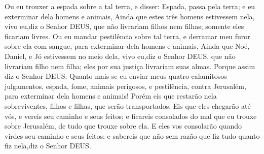 {  Ou
{} eu trouxer a espada sobre a tal terra, e disser: Espada, passa pela terra; e eu exterminar dela homens e animais,
  Ainda que estes três homens estivessem nela, vivo eu,diz o Senhor DEUS, que não livrariam filhos nem filhas; somente eles ficariam livres.
  Ou
{} eu mandar pestilência sobre tal terra, e derramar meu furor sobre ela com sangue, para exterminar dela homens e animais,
  Ainda que Noé, Daniel, e Jó estivessem no meio dela, vivo eu,diz o Senhor DEUS, que não livrariam filho nem filha; eles por sua justiça livrariam suas
{} almas.
  Porque assim diz o Senhor DEUS: Quanto mais se eu enviar meus quatro calamitosos
 julgamentos, espada, fome, animais perigosos, e pestilência, contra Jerusalém, para exterminar dela homens e animais!
  Porém eis que restarão nela
{} sobreviventes, filhos e filhas, que serão transportados. Eis que eles chegarão até vós, e vereis seu caminho e seus feitos; e ficareis consolados do mal que eu trouxe sobre Jerusalém, de tudo que trouxe sobre ela.
  E eles vos consolarão quando virdes seu caminho e seus feitos; e sabereis que não sem razão que fiz tudo quanto fiz nela,diz o Senhor DEUS.
\par }



